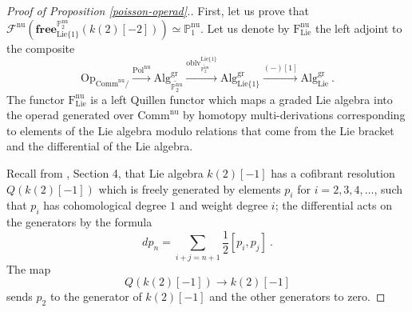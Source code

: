 \documentclass[10pt, oneside]{amsart}
\theoremstyle{plain}
\newcommand{\alg}{\mathrm{Alg}}
\newcommand{\comm}{\mathrm{Comm}}
\newcommand{\f}{\mathrm{F}}
\newcommand{\F}{\mathcal{F}}
\newcommand{\Free}{\mathbf{free}}
\newcommand{\gr}{\mathrm{gr}}
\newcommand{\lie}{\mathrm{Lie}}
\renewcommand{\nu}{\mathrm{nu}}
\newcommand{\oblv}{\mathrm{oblv}}
\newcommand{\op}{\mathrm{Op}}
\newcommand{\PP}{\mathbb{P}}
\newcommand{\pol}{\mathrm{Pol}}
\newcommand{\tP}{{\widetilde{\mathbb{P}^\mathrm{nu}_2}}}
\begin{document}
\begin{proof}[Proof of Proposition \ref{poisson-operad}.]
First, let us prove that
$\F^\text{nu}(\Free^{\PP_2^\nu}_{\lie\{1\}} (k(2)[-2])) \simeq \PP^\text{nu}_1$. 
Let us denote by $\f^\nu_\lie$ the left adjoint to the composite
\begin{equation*}
\op_{\comm^\nu/} \stackrel{\pol^\nu}{\longrightarrow} \alg^\gr_\tP \stackrel{\oblv^{\lie\{1\}}_\tP}{\longrightarrow} \alg^\gr_{\lie\{1\}} \stackrel{(-)[1]}{\longrightarrow} \alg^\gr_\lie \:.
\end{equation*}
The functor $\f^\nu_\lie$ is a left Quillen functor which maps a graded Lie algebra into the operad generated over $\comm^\nu$ by
homotopy multi-derivations corresponding to elements of the Lie algebra modulo relations that come from the Lie bracket and 
the differential of the Lie algebra.

Recall from \cite{Melani}, Section 4, that Lie algebra $k(2)[-1]$ has a cofibrant resolution
$Q(k(2)[-1])$ which is freely generated by elements $p_i$ for $i = 2, 3, 4, \ldots$, such that $p_i$ has cohomological degree $1$ 
and weight degree $i$; the differential acts on the generators by the formula
\begin{equation*}
d p_n = \sum_{i + j = n+1} \frac{1}{2}[p_i, p_j] \:.
\end{equation*}
The map
\begin{equation*}
Q(k(2)[-1]) \longrightarrow k(2)[-1]
\end{equation*}
sends $p_2$ to the generator of $k(2)[-1]$ and the other generators to zero.


\end{proof}
\end{document}

